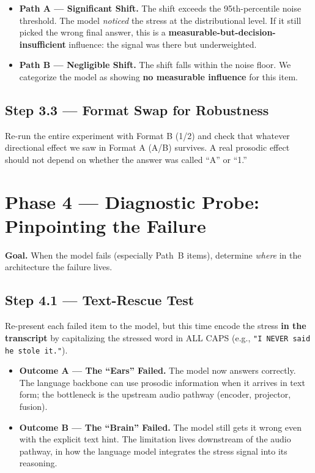 \documentclass[11pt]{article}
\begin{document}
\begin{itemize}
    \item \textbf{Path A --- Significant Shift.} The shift exceeds the
    95th-percentile noise threshold. The model \emph{noticed} the
    stress at the distributional level. If it still picked the wrong
    final answer, this is a \textbf{measurable-but-decision-
    insufficient} influence: the signal was there but underweighted.
    \item \textbf{Path B --- Negligible Shift.} The shift falls within
    the noise floor. We categorize the model as showing \textbf{no
    measurable influence} for this item.
\end{itemize}

\subsection*{Step 3.3 --- Format Swap for Robustness}

Re-run the entire experiment with Format B (1/2) and check that
whatever directional effect we saw in Format A (A/B) survives. A real
prosodic effect should not depend on whether the answer was called
``A'' or ``1.''

\section{Phase 4 --- Diagnostic Probe: Pinpointing the Failure}

\textbf{Goal.} When the model fails (especially Path~B items),
determine \emph{where} in the architecture the failure lives.

\subsection*{Step 4.1 --- Text-Rescue Test}

Re-present each failed item to the model, but this time encode the
stress \textbf{in the transcript} by capitalizing the stressed word
in ALL CAPS (e.g., \texttt{"I NEVER said he stole it."}).

\begin{itemize}
    \item \textbf{Outcome A --- The ``Ears'' Failed.} The model now
    answers correctly. The language backbone can use prosodic
    information when it arrives in text form; the bottleneck is the
    upstream audio pathway (encoder, projector, fusion).
    \item \textbf{Outcome B --- The ``Brain'' Failed.} The model
    still gets it wrong even with the explicit text hint. The
    limitation lives downstream of the audio pathway, in how the
    language model integrates the stress signal into its reasoning.
\end{itemize}
\end{document}
